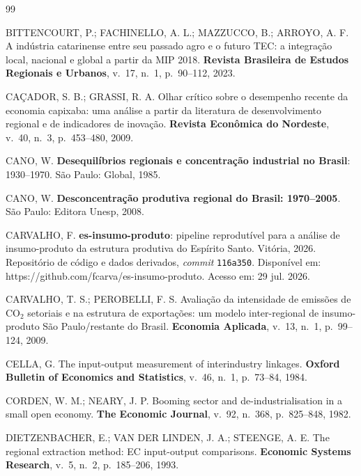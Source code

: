 \documentclass[11pt,a4paper]{article}
\begin{document}
\begin{thebibliography}{99}

BITTENCOURT, P.; FACHINELLO, A. L.; MAZZUCCO, B.; ARROYO, A. F. A indústria
catarinense entre seu passado agro e o futuro TEC: a integração local, nacional e
global a partir da MIP 2018. \textbf{Revista Brasileira de Estudos Regionais e
Urbanos}, v.~17, n.~1, p.~90--112, 2023.

CAÇADOR, S. B.; GRASSI, R. A. Olhar crítico sobre o desempenho recente da economia
capixaba: uma análise a partir da literatura de desenvolvimento regional e de
indicadores de inovação. \textbf{Revista Econômica do Nordeste}, v.~40, n.~3,
p.~453--480, 2009.

CANO, W. \textbf{Desequilíbrios regionais e concentração industrial no Brasil}:
1930--1970. São Paulo: Global, 1985.

CANO, W. \textbf{Desconcentração produtiva regional do Brasil: 1970--2005}. São Paulo:
Editora Unesp, 2008.

CARVALHO, F. \textbf{es-insumo-produto}: pipeline reprodutível para a análise de
insumo-produto da estrutura produtiva do Espírito Santo. Vitória, 2026. Repositório de
código e dados derivados, \emph{commit} \texttt{116a350}. Disponível em:
https://github.com/fcarva/es-insumo-produto. Acesso em: 29 jul. 2026.

CARVALHO, T. S.; PEROBELLI, F. S. Avaliação da intensidade de emissões de CO$_2$
setoriais e na estrutura de exportações: um modelo inter-regional de insumo-produto
São Paulo/restante do Brasil. \textbf{Economia Aplicada}, v.~13, n.~1, p.~99--124, 2009.

CELLA, G. The input-output measurement of interindustry linkages. \textbf{Oxford
Bulletin of Economics and Statistics}, v.~46, n.~1, p.~73--84, 1984.

CORDEN, W. M.; NEARY, J. P. Booming sector and de-industrialisation in a small
open economy. \textbf{The Economic Journal}, v.~92, n.~368, p.~825--848, 1982.

DIETZENBACHER, E.; VAN DER LINDEN, J. A.; STEENGE, A. E. The regional extraction
method: EC input-output comparisons. \textbf{Economic Systems Research}, v.~5,
n.~2, p.~185--206, 1993.


\end{thebibliography}
\end{document}
